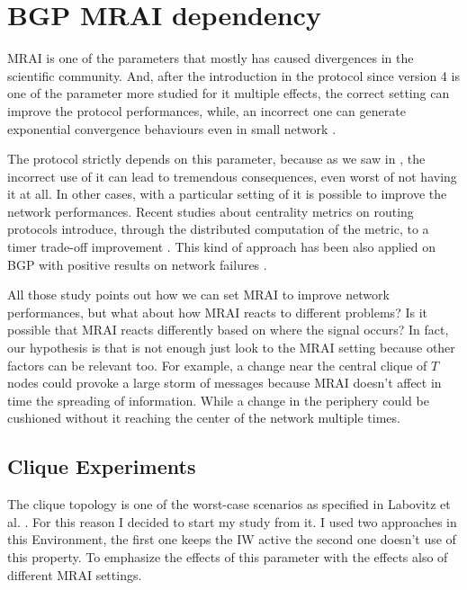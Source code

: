 \chapter{BGP MRAI dependency}
\label{cha:bgp_mrai_experiments}

\ac{MRAI} is one of the parameters that mostly has caused divergences in the
scientific community.
And, after the introduction in the protocol since version 4 \cite{rfc4271}
is one of the parameter more studied for it multiple effects, the correct setting
can improve the protocol performances, while, an incorrect one can generate
exponential convergence behaviours even in small network
\cite{fabrikant2011there,griffin2001experimental}.

The protocol strictly depends on this parameter, because as we saw in ,
the incorrect use of it can lead to tremendous consequences, even worst of not
having it at all.
In other cases, with a particular setting of it is possible to improve the network
performances.
Recent studies about centrality metrics on routing protocols introduce, through
the distributed computation of the metric, to a
timer trade-off improvement \cite{MaLo18_ToN,GhiMa18_infocom}.
This kind of approach has been also applied on \ac{BGP} with positive results on
network failures \cite{milani2019BGP,milani2020improving}.

All those study points out how we can set \ac{MRAI} to improve network
performances, but what about how \ac{MRAI} reacts to different problems?
Is it possible that \ac{MRAI} reacts differently based on where the signal
occurs?
In fact, our hypothesis is that is not enough just look to the \ac{MRAI} setting
because other factors can be relevant too.
For example, a change near the central clique of $T$ nodes could provoke a large
storm of messages because \ac{MRAI} doesn't affect in time the spreading of information.
While a change in the periphery could be cushioned without it reaching the center
of the network multiple times.

\section{Clique Experiments}
\label{sec:bgp_mrai_clique}

The clique topology is one of the worst-case scenarios as specified in Labovitz et al.
\cite{labovitz2000delayed}.
For this reason I decided to start my study from it.
I used two approaches in this Environment, the first one keeps the \ac{IW} active
the second one doesn't use of this property.
To emphasize the effects of this parameter with the effects also of different
\ac{MRAI} settings.

